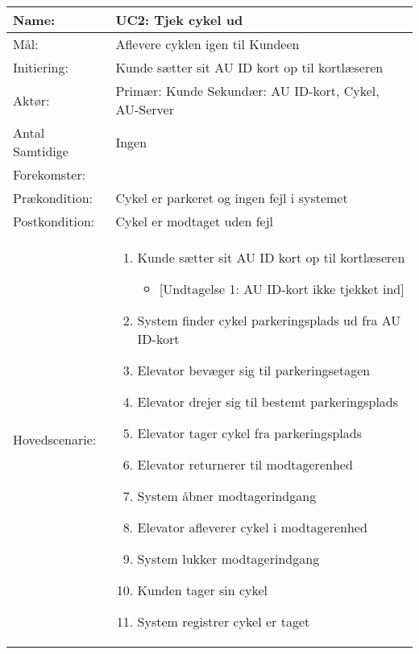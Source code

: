 \documentclass[../main.tex]{subfiles}
\begin{document}
\begin{table}[H]
\begin{tabularx}{\textwidth}{|l|X|}\rowcolor[HTML]{DFDFDF}\hline
    Name:                           & UC2: Tjek cykel ud  \\ \hline
    Mål:                            & Aflevere cyklen igen til Kundeen  \\\hline \rowcolor[HTML]{DFDFDF}
    Initiering:                     & Kunde sætter sit AU ID kort op til kortlæseren  \\\hline 
    Aktør:                          & Primær: Kunde \newline 
                                    Sekundær: AU ID-kort, Cykel, AU-Server \\ \hline\rowcolor[HTML]{DFDFDF}
    Antal Samtidige & Ingen \\\rowcolor[HTML]{DFDFDF} Forekomster:    &  \\\hline 
    Prækondition:                   & Cykel er parkeret og ingen fejl i systemet  \\ \hline\rowcolor[HTML]{DFDFDF}
    Postkondition:                  & Cykel er modtaget uden fejl \\\hline 
    Hovedscenarie:                  & 
    \setlist{nolistsep}
    \begin{enumerate}
        \item Kunde sætter sit AU ID kort op til kortlæseren
        \begin{itemize}
            \item {[Undtagelse 1: AU ID-kort ikke tjekket ind]}
        \end{itemize}
        \item System finder cykel parkeringsplads ud fra AU ID-kort
        \item Elevator bevæger sig til parkeringsetagen
        \item Elevator drejer sig til bestemt parkeringsplads
        \item Elevator tager cykel fra parkeringsplads
        \item Elevator returnerer til modtagerenhed
        \item System åbner modtagerindgang
        \item Elevator afleverer cykel i modtagerenhed
        \item System lukker modtagerindgang
        \item Kunden tager sin cykel
        \item System registrer cykel er taget

\end{enumerate}
\end{tabularx}
\end{table}
\end{document}
